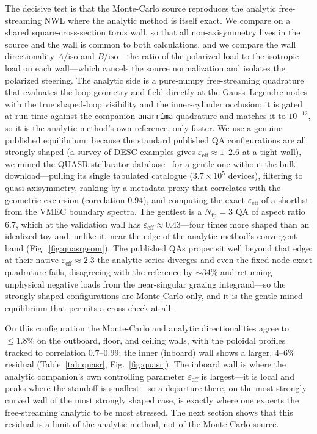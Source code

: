 \documentclass[11pt]{article}
\newcommand{\Nfp}{N_{\mathrm{fp}}}
\newcommand{\eps}{\varepsilon}
\newcommand{\epseff}{\eps_{\mathrm{eff}}}
\newcommand{\iso}{\mathrm{iso}}
\begin{document}
The decisive test is that the Monte-Carlo source reproduces the analytic free-streaming
NWL where the analytic method is itself exact. We compare on a shared square-cross-section
torus wall, so that all non-axisymmetry lives in the source and the wall is common to both
calculations, and we compare the wall directionality $A/\iso$ and $B/\iso$---the ratio of
the polarized load to the isotropic load on each wall---which cancels the source
normalization and isolates the polarized steering. The analytic side is a pure-numpy
free-streaming quadrature that evaluates the loop geometry and field directly at the
Gauss--Legendre nodes with the true shaped-loop visibility and the inner-cylinder
occlusion; it is gated at run time against the companion \texttt{anarr\'ima} quadrature
and matches it to $10^{-12}$, so it is the analytic method's own reference, only faster. We
use a genuine published equilibrium: because the standard published QA configurations are
all strongly shaped (a survey of DESC examples gives $\epseff\approx1$--$2.6$ at a tight
wall), we mined the QUASR stellarator database~\cite{quasr} for a gentle one without the
bulk download---pulling its single tabulated catalogue ($3.7\times10^5$ devices), filtering
to quasi-axisymmetry, ranking by a metadata proxy that correlates with the geometric
excursion (correlation $0.94$), and computing the exact $\epseff$ of a shortlist from the
VMEC boundary spectra. The gentlest is a $\Nfp=3$ QA of aspect ratio $6.7$, which at the
validation wall has $\epseff\approx0.43$---four times more shaped than an idealized toy and,
unlike it, near the edge of the analytic method's convergent band
(Fig.~\ref{fig:quasrgeom}). The published QAs proper sit well beyond that edge: at their
native $\epseff\approx2.3$ the analytic series diverges and even the fixed-node exact
quadrature fails, disagreeing with the reference by $\sim\!34\%$ and returning unphysical
negative loads from the near-singular grazing integrand---so the strongly shaped
configurations are Monte-Carlo-only, and it is the gentle mined equilibrium that permits a
cross-check at all.

On this configuration the Monte-Carlo and analytic directionalities agree to $\le1.8\%$ on
the outboard, floor, and ceiling walls, with the poloidal profiles tracked to correlation
$0.7$--$0.99$; the inner (inboard) wall shows a larger, $4$--$6\%$ residual
(Table~\ref{tab:quasr}, Fig.~\ref{fig:quasr}). The inboard wall is where the analytic
companion's own controlling parameter $\epseff$ is largest---it is local and peaks where
the standoff is smallest---so a departure there, on the most strongly curved wall of the
most strongly shaped case, is exactly where one expects the free-streaming analytic to be
most stressed. The next section shows that this residual is a limit of the analytic method,
not of the Monte-Carlo source.
\end{document}
